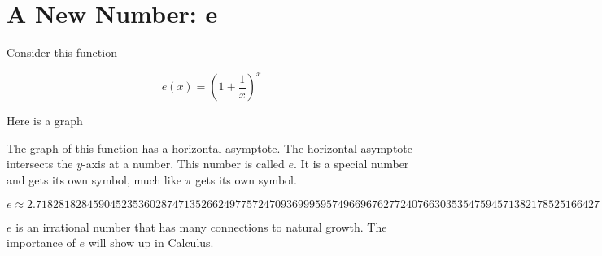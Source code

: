\documentclass{ximera}
\begin{document}
\section{A New Number: e}


Consider this function 

\[
e(x) = \left(1 + \frac{1}{x}\right)^x
\]



Here is a graph


\begin{center}
\end{center}


The graph of this function has a horizontal asymptote.  The horizontal asymptote intersects the $y$-axis at a number.  This number is called $e$.   It is a special number and gets its own symbol, much like $\pi$ gets its own symbol.



\[
e \approx  2.718281828459045235360287471352662497757247093699959574966967627724076630353547594571382178525166427
\]


$e$ is an irrational number that has many connections to natural growth.  The importance of $e$ will show up in Calculus.
\end{document}
